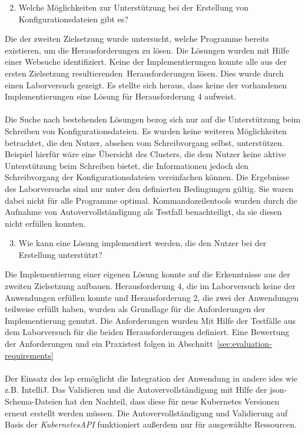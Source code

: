 \begin{enumerate}
    \setcounter{enumi}{1}
    \item Welche Möglichkeiten zur Unterstützung bei der Erstellung von Konfigurationsdateien gibt es?
\end{enumerate}

Die der zweiten Zielsetzung wurde untersucht, welche Programme bereits existieren, um die Herausforderungen zu lösen.
Die Lösungen wurden mit Hilfe einer Websuche identifiziert.
Keine der Implementierungen konnte alle aus der ersten Zielsetzung resultierenden\ Herausforderungen lösen.
Dies wurde durch einen Laborversuch gezeigt.
Es stellte sich heraus, dass keine der vorhandenen Implementierungen eine Lösung für Herausforderung 4 aufweist.
\\\\
Die Suche nach bestehenden Lösungen bezog sich nur auf die Unterstützung beim Schreiben von Konfigurationsdateien.
Es wurden keine weiteren Möglichkeiten betrachtet, die den Nutzer, absehen vom Schreibvorgang selbst, unterstützen.
Beispiel hierfür wäre eine Übersicht des Clusters, die dem Nutzer keine aktive Unterstützung beim Schreiben bietet,
die Informationen jedoch den Schreibvorgang der Konfigurationsdateien vereinfachen können.
Die Ergebnisse des Laborversuchs sind nur unter den definierten Bedingungen gültig.
Sie waren dabei nicht für alle Programme optimal. Kommandozeilentools wurden durch die Aufnahme von Autovervollständigung als Testfall benachteiligt,
da sie diesen nicht erfüllen konnten.

\begin{enumerate}
    \setcounter{enumi}{2}
    \item Wie kann eine Lösung implementiert werden, die den Nutzer bei der Erstellung unterstützt?
\end{enumerate}

Die Implementierung einer eigenen Lösung konnte auf die Erkenntnisse aus der zweiten Zielsetzung aufbauen.
Herausforderung 4, die im Laborversuch keine der Anwendungen erfüllen konnte und Herausforderung 2, die zwei der Anwendungen teilweise erfüllt haben,
wurden als Grundlage für die Anforderungen der Implementierung genutzt.
Die Anforderungen wurden Mit Hilfe der Testfälle aus dem Laborversuch für die beiden Herausforderungen definiert.
Eine Bewertung der Anforderungen und ein Praxistest folgen in Abschnitt~\ref{sec:evaluation-requirements}
\\\\
Der Einsatz des \ac{lsp} ermöglicht die Integration der Anwendung in andere \ac{ide}s wie z.B. IntelliJ.
Das Validieren und die Autovervollständigung mit Hilfe der \ac{json}-Schema-Dateien hat den Nachteil, dass diese für neue Kubernetes Versionen
erneut erstellt werden müssen.
Die Autovervollständigung und Validierung auf Basis der \textit{KubernetesAPI} funktioniert außerdem nur für ausgewählte Ressourcen.

